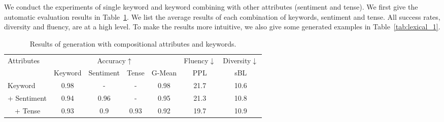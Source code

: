 \documentclass[11pt]{article}
\begin{document}
We conduct the experiments of single keyword and keyword combining with other attributes (sentiment and tense). 
We first give the automatic evaluation results in Table~\ref{tab:lexical_cg}. We list the average results of each combination of keywords, sentiment and tense. All success rates, diversity and fluency, are at a high level. To make the results more intuitive, we also give some generated examples in Table~\ref{tab:lexical_1}.
\begin{table}[ht]
\small
\centering
\vspace{-8pt}
\begin{tabular}{lcccccc}
\toprule
\multirow{2}{*}{Attributes}& \multicolumn{4}{c}{Accuracy$\uparrow$} &  Fluency$\downarrow$ & Diversity$\downarrow$\\
\cmidrule(r){2-5}\cmidrule(r){6-6}\cmidrule(r){7-7}
&Keyword & Sentiment & Tense & G-Mean &PPL & sBL    \\
\midrule
{Keyword}  &{0.98} &-&-&{0.98} & 21.7 & {10.6} \\
                 \cmidrule{2-7}
{+ Sentiment}   &{0.94}& {0.96}& -& {0.95}& 21.3& {10.8}\\
                 \cmidrule{2-7}
{\ \ + Tense}   &{0.93}& {0.9}& {0.93}  &{0.92}   & 19.7            & 10.9\\
                 \bottomrule
\end{tabular}
\vspace{-5pt}
\caption{Results of generation with compositional attributes and keywords. 
}
\label{tab:lexical_cg}
\vspace{-10pt}
\end{table}
\end{document}
